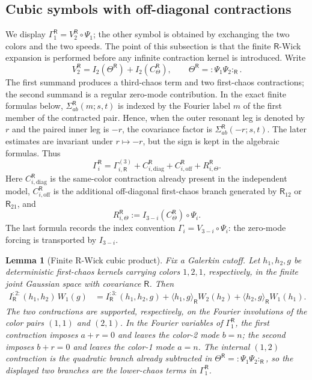 \documentclass[10pt]{amsart}
\numberwithin{equation}{section}
\theoremstyle{plain}
\newtheorem{lemma}[theorem]{Lemma}
\theoremstyle{definition}
\theoremstyle{remark}
\begin{document}
\subsection{Cubic symbols with off-diagonal contractions}
We display \(\Gamma_1^{\mathsf R}=V_2^{\mathsf R}\circ\Psi_1\); the other symbol is obtained by exchanging the two colors and the two speeds.  The point of this subsection is that the finite \(\mathsf R\)-Wick expansion is performed before any infinite contraction kernel is introduced.  Write
\[
        V_2^{\mathsf R}=I_2(\Theta^{\mathsf R})+I_2(C_\Theta^{\mathsf R}),
        \qquad \Theta^{\mathsf R}=:\Psi_1\Psi_2:_{\mathsf R}.
\]
The first summand produces a third-chaos term and two first-chaos contractions; the second summand is a regular zero-mode contribution.  In the exact finite formulas below, \(\Sigma_{ab}^{\mathsf R}(m;s,t)\) is indexed by the Fourier label \(m\) of the first member of the contracted pair.  Hence, when the outer resonant leg is denoted by \(r\) and the paired inner leg is \(-r\), the covariance factor is \(\Sigma_{ab}^{\mathsf R}(-r;s,t)\).  The later estimates are invariant under \(r\mapsto-r\), but the sign is kept in the algebraic formulas.  Thus
\begin{equation}\label{eq:wc-cubic-decomp}
        \Gamma_i^{\mathsf R}
        =\Gamma_{i,\mathsf R}^{(3)}+C_{i,\mathrm{diag}}^{\mathsf R}
        +C_{i,\mathrm{off}}^{\mathsf R}+R_{i,\Theta}^{\mathsf R}.
\end{equation}
Here \(C_{i,\mathrm{diag}}^{\mathsf R}\) is the same-color contraction already present in the independent model, \(C_{i,\mathrm{off}}^{\mathsf R}\) is the additional off-diagonal first-chaos branch generated by \(\mathsf R_{12}\) or \(\mathsf R_{21}\), and
\[
        R_{i,\Theta}^{\mathsf R}
        := I_{3-i}(C_\Theta^{\mathsf R})\circ\Psi_i.
\]
The last formula records the index convention \(\Gamma_i=V_{3-i}\circ\Psi_i\): the zero-mode forcing is transported by \(I_{3-i}\).

\begin{lemma}[Finite R-Wick cubic product]\label{lem:wc-cubic-finite-wick}
Fix a Galerkin cutoff.  Let \(h_1,h_2,g\) be deterministic first-chaos kernels carrying colors \(1,2,1\), respectively, in the finite joint Gaussian space with covariance \(\mathsf R\).  Then
\begin{align}\label{eq:wc-cubic-wick-product}
        I^{:2:}_{\mathsf R}(h_1,h_2)\,W_1(g)
        &= I^{:3:}_{\mathsf R}(h_1,h_2,g)
        + \langle h_1,g\rangle_{\mathsf R} W_2(h_2)
        + \langle h_2,g\rangle_{\mathsf R} W_1(h_1).
\end{align}
The two contractions are supported, respectively, on the Fourier involutions of the color pairs \((1,1)\) and \((2,1)\).  In the Fourier variables of \(\Gamma_1^{\mathsf R}\), the first contraction imposes \(a+r=0\) and leaves the color-2 mode \(b=n\); the second imposes \(b+r=0\) and leaves the color-1 mode \(a=n\).  The internal \((1,2)\) contraction is the quadratic branch already subtracted in \(\Theta^{\mathsf R}=:\Psi_1\Psi_2:_{\mathsf R}\), so the displayed two branches are the lower-chaos terms in \(\Gamma_1^{\mathsf R}\).
\end{lemma}
\end{document}
